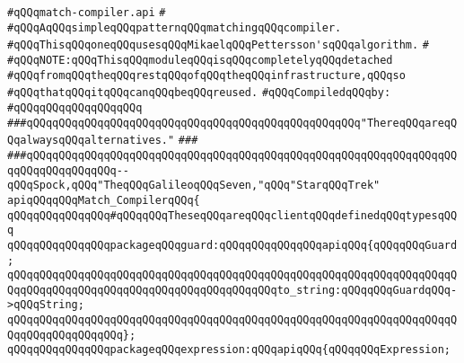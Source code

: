 \label{src/lib/compiler/back/low/tools/match-compiler/match-compiler.api}
\verb|#qQQqmatch-compiler.api|\newline
\verb|#|\newline
\verb|#qQQqAqQQqsimpleqQQqpatternqQQqmatchingqQQqcompiler.|\newline
\verb|#qQQqThisqQQqoneqQQqusesqQQqMikaelqQQqPettersson'sqQQqalgorithm.|\newline
\verb|#|\newline
\verb|#qQQqNOTE:qQQqThisqQQqmoduleqQQqisqQQqcompletelyqQQqdetached|\newline
\verb|#qQQqfromqQQqtheqQQqrestqQQqofqQQqtheqQQqinfrastructure,qQQqso|\newline
\verb|#qQQqthatqQQqitqQQqcanqQQqbeqQQqreused.|\newline
\newline
\verb|#qQQqCompiledqQQqby:|\newline
\verb|#qQQqqQQqqQQqqQQqqQQq|\newline
\newline
\verb|###qQQqqQQqqQQqqQQqqQQqqQQqqQQqqQQqqQQqqQQqqQQqqQQqqQQq"ThereqQQqareqQQqalwaysqQQqalternatives."|\newline
\verb|###|\newline
\verb|###qQQqqQQqqQQqqQQqqQQqqQQqqQQqqQQqqQQqqQQqqQQqqQQqqQQqqQQqqQQqqQQqqQQqqQQqqQQqqQQqqQQq--qQQqSpock,qQQq"TheqQQqGalileoqQQqSeven,"qQQq"StarqQQqTrek"|\newline
\newline
\newline
\newline
\verb|apiqQQqqQQqMatch_CompilerqQQq{|\newline
\newline
\verb|qQQqqQQqqQQqqQQq#qQQqqQQqTheseqQQqareqQQqclientqQQqdefinedqQQqtypesqQQq|\newline
\verb|qQQqqQQqqQQqqQQqpackageqQQqguard:qQQqqQQqqQQqqQQqapiqQQq{qQQqqQQqGuard;|\newline
\verb|qQQqqQQqqQQqqQQqqQQqqQQqqQQqqQQqqQQqqQQqqQQqqQQqqQQqqQQqqQQqqQQqqQQqqQQqqQQqqQQqqQQqqQQqqQQqqQQqqQQqqQQqqQQqqQQqto_string:qQQqqQQqGuardqQQq->qQQqString;|\newline
\verb|qQQqqQQqqQQqqQQqqQQqqQQqqQQqqQQqqQQqqQQqqQQqqQQqqQQqqQQqqQQqqQQqqQQqqQQqqQQqqQQqqQQqqQQq};|\newline
\newline
\verb|qQQqqQQqqQQqqQQqpackageqQQqexpression:qQQqapiqQQq{qQQqqQQqExpression;|\newline
